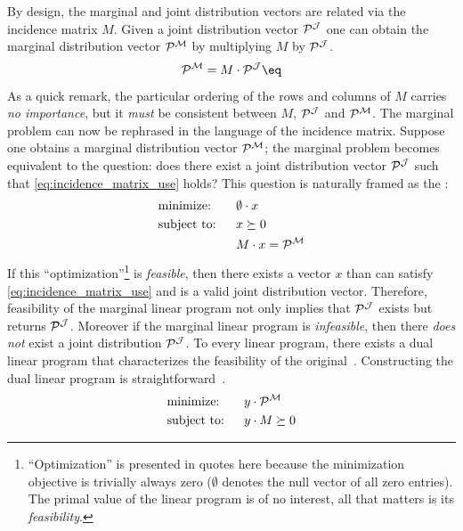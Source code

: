 \documentclass[aps, 10pt, english, twoside, pra, nofootinbib, tightenlines, longbibliography, superscriptaddress]{revtex4-1}
\begin{document}
    By design, the marginal and joint distribution vectors are related via the incidence matrix $M$. Given a joint distribution vector $\probvec^{\jointvar}$ one can obtain the marginal distribution vector $\probvec^{\mscenario}$ by multiplying $M$ by $\probvec^{\jointvar}$.
    \[ \probvec^{\mscenario} = M \cdot \probvec^{\jointvar} \eq \label{eq:incidence_matrix_use} \]
    As a quick remark, the particular ordering of the rows and columns of $M$ carries \textit{no importance}, but it \textit{must} be consistent between $M$, $\probvec^{\jointvar}$ and $\probvec^{\mscenario}$. The marginal problem can now be rephrased in the language of the incidence matrix. Suppose one obtains a marginal distribution vector $\probvec^{\mscenario}$; the marginal problem becomes equivalent to the question: does there exist a joint distribution vector $\probvec^{\jointvar}$ such that \cref{eq:incidence_matrix_use} holds? This question is naturally framed as the :
    \begin{equation}
    \begin{aligned}
        & \text{minimize:} \quad&& \emptyset \cdot x\\
        & \text{subject to:} && x \succeq 0 \\
        & && M \cdot x = \probvec^{\mscenario}
    \end{aligned}
    \end{equation}
    If this ``optimization''\footnote{``Optimization'' is presented in quotes here because the minimization objective is trivially always zero ($\emptyset$ denotes the null vector of all zero entries). The primal value of the linear program is of no interest, all that matters is its \textit{feasibility}.} is \textit{feasible}, then there exists a vector $x$ than can satisfy \cref{eq:incidence_matrix_use} and is a valid joint distribution vector. Therefore, feasibility of the marginal linear program not only implies that $\probvec^{\jointvar}$ exists but returns $\probvec^{\jointvar}$. Moreover if the marginal linear program is \textit{infeasible}, then there \textit{does not} exist a joint distribution $\probvec^{\jointvar}$. To every linear program, there exists a dual linear program that characterizes the feasibility of the original~\cite{Schrijver_1998}. Constructing the dual linear program is straightforward~\cite{Lahaie_2008}.
    \begin{equation}
    \begin{aligned}
        & \text{minimize:} \quad&& y \cdot \probvec^{\mscenario}\\
        & \text{subject to:} && y \cdot M \succeq 0
    \end{aligned}
    \end{equation}
\end{document}
